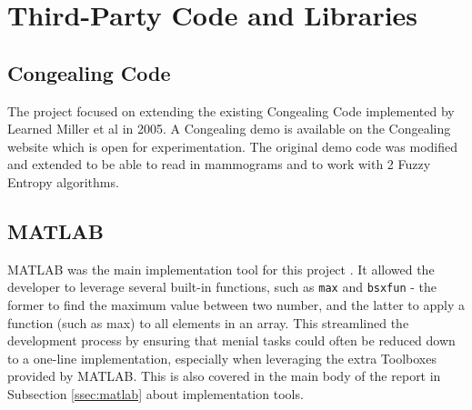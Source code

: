 \chapter{Third-Party Code and Libraries}







\section{Congealing Code}

The project focused on extending the existing Congealing Code implemented by Learned Miller et al in 2005. A Congealing demo is available on the Congealing website \cite{Learned-Miller} which is open for experimentation. The original demo code was modified and extended to be able to read in mammograms and to work with 2 Fuzzy Entropy algorithms.

\section{MATLAB}

MATLAB was the main implementation tool for this project \cite{MATLAB:2016}. It allowed the developer to leverage several built-in functions, such as \texttt{max} and \texttt{bsxfun} - the former to find the maximum value between two number, and the latter to apply a function (such as max) to all elements in an array. This streamlined the development process by ensuring that menial tasks could often be reduced down to a one-line implementation, especially when leveraging the extra Toolboxes provided by MATLAB. This is also covered in the main body of the report in Subsection \ref{ssec:matlab} about implementation tools.

